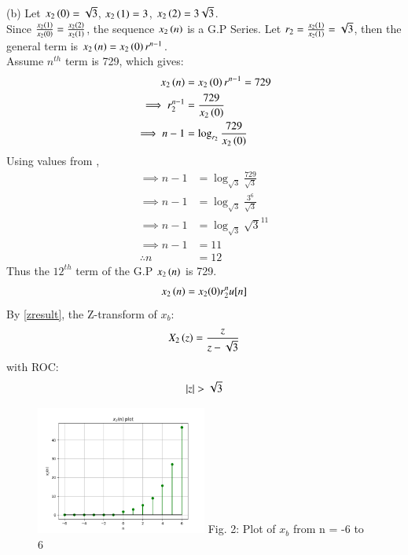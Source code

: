 \documentclass[journal,12pt,twocolumn]{IEEEtran}
\theoremstyle{remark}
\begin{document}
(b) Let $x_2\left(0\right) = \sqrt{3}$, $x_2\left(1\right) = 3$, $x_2\left(2\right) = 3\sqrt{3}$.\\
Since $\frac{x_2\left(1\right)}{x_2\left(0\right)} = \frac{x_2\left(2\right)}{x_2\left(1\right)}$, the sequence $x_2\left(n\right)$ is a G.P Series.
Let $r_2 = \frac{x_2\left(1\right)}{x_2\left(1\right)} = \sqrt{3}$, then the general term is $x_2\left(n\right) = x_2\left(0\right) r^{n-1}$.\\
Assume $n^{th}$ term is 729, which gives: 
\begin{align}
    x_2\left(n\right) &= x_2\left(0\right) r^{n-1} = 729\\
    \implies r_2^{n-1} &= \frac{729}{x_2\left(0\right)}\\
    \implies n - 1 &= \log_{r_2}{\frac{729}{x_2\left(0\right)}}
\end{align}
Using values from ,
\begin{align}
    \implies n - 1 &= \log_{\sqrt{3}}{\frac{729}{\sqrt{3}}}\\
    \implies n - 1 &= \log_{\sqrt{3}}{\frac{3^6}{\sqrt{3}}}\\
    \implies n - 1 &= \log_{\sqrt{3}}{\sqrt{3}^{11}}\\
    \implies n - 1 &= 11\\
    \therefore n &= 12
\end{align}
Thus the $12^{th}$ term of the G.P $x_2\left(n\right)$ is 729.
\begin{align}  x_2\left(n\right) = x_2(0)r_2^nu[n]  \end{align}
By \ref{zresult}, the Z-transform of $x_b$:
\begin{align} X_2\left(z\right) = \frac{z}{z - \sqrt{3}} \end{align}
with ROC: \[ \left\vert z\right\vert > \sqrt{3} \]
\begin{figure}[h!]
    \centering
    \includegraphics[width=0.5\textwidth]{figs/b.png}
    Fig. 2: Plot of $x_b$ from n = -6 to 6
    \label{fig:img2}
\end{figure}
\end{document}
